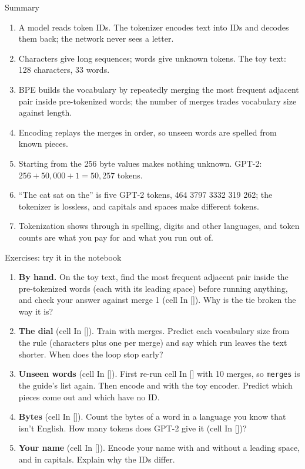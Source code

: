 \documentclass[aspectratio=169,11pt,t,\primeropts]{beamer}
\begin{document}
\begin{frame}{Summary}
  \begin{enumerate}\small
    \item A model reads token IDs. The tokenizer encodes text into IDs and decodes them back; the
      network never sees a letter.
    \item Characters give long sequences; words give unknown tokens. The toy text: 128 characters,
      33 words.
    \item BPE builds the vocabulary by repeatedly merging the most frequent adjacent pair inside
      pre-tokenized words; the number of merges trades vocabulary size against length.
    \item Encoding replays the merges in order, so unseen words are spelled from known pieces.
    \item Starting from the 256 byte values makes nothing unknown. GPT-2: $256 + 50{,}000 + 1 =
      50{,}257$ tokens.
    \item ``The cat sat on the'' is five GPT-2 tokens, 464 3797 3332 319 262; the tokenizer is
      lossless, and capitals and spaces make different tokens.
    \item Tokenization shows through in spelling, digits and other languages, and token counts are
      what you pay for and what you run out of.
  \end{enumerate}
\end{frame}

\begin{frame}{Exercises: try it in the notebook}
  \small
  \begin{enumerate}
    \item \textbf{By hand.} On the toy text, find the most frequent adjacent pair inside the
      pre-tokenized words (each with its leading space) before running anything, and check your answer against merge 1 (cell In
      []). Why is the tie broken the way it is?
    \item \textbf{The dial} (cell In []). Train with  merges.
      Predict each vocabulary size from the rule (characters plus one per merge) and say which run
      leaves the text shorter. When does the loop stop early?
    \item \textbf{Unseen words} (cell In []). First re-run cell In []
      with 10 merges, so \texttt{merges} is the guide's list again. Then encode  and
       with the toy encoder. Predict which pieces come out and which have no ID.
    \item \textbf{Bytes} (cell In []). Count the bytes of a word in a language you
      know that isn't English. How many tokens does GPT-2 give it (cell In [])?
    \item \textbf{Your name} (cell In []). Encode your name with and without a
      leading space, and in capitals. Explain why the IDs differ.
  \end{enumerate}
\end{frame}
\end{document}
